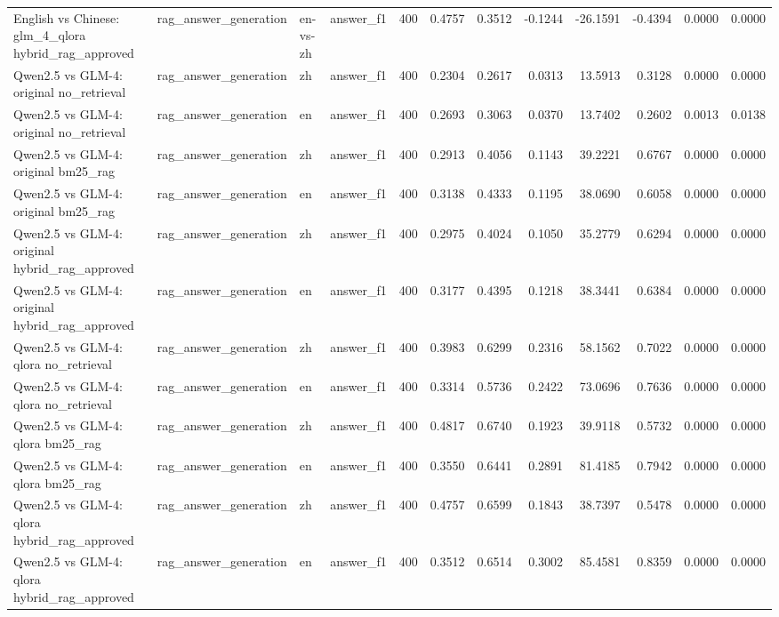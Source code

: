 \begin{tabular}{llllrrrrrrrr}
English vs Chinese: glm_4_qlora hybrid_rag_approved & rag_answer_generation & en-vs-zh & answer_f1 & 400 & 0.4757 & 0.3512 & -0.1244 & -26.1591 & -0.4394 & 0.0000 & 0.0000 \\
Qwen2.5 vs GLM-4: original no_retrieval & rag_answer_generation & zh & answer_f1 & 400 & 0.2304 & 0.2617 & 0.0313 & 13.5913 & 0.3128 & 0.0000 & 0.0000 \\
Qwen2.5 vs GLM-4: original no_retrieval & rag_answer_generation & en & answer_f1 & 400 & 0.2693 & 0.3063 & 0.0370 & 13.7402 & 0.2602 & 0.0013 & 0.0138 \\
Qwen2.5 vs GLM-4: original bm25_rag & rag_answer_generation & zh & answer_f1 & 400 & 0.2913 & 0.4056 & 0.1143 & 39.2221 & 0.6767 & 0.0000 & 0.0000 \\
Qwen2.5 vs GLM-4: original bm25_rag & rag_answer_generation & en & answer_f1 & 400 & 0.3138 & 0.4333 & 0.1195 & 38.0690 & 0.6058 & 0.0000 & 0.0000 \\
Qwen2.5 vs GLM-4: original hybrid_rag_approved & rag_answer_generation & zh & answer_f1 & 400 & 0.2975 & 0.4024 & 0.1050 & 35.2779 & 0.6294 & 0.0000 & 0.0000 \\
Qwen2.5 vs GLM-4: original hybrid_rag_approved & rag_answer_generation & en & answer_f1 & 400 & 0.3177 & 0.4395 & 0.1218 & 38.3441 & 0.6384 & 0.0000 & 0.0000 \\
Qwen2.5 vs GLM-4: qlora no_retrieval & rag_answer_generation & zh & answer_f1 & 400 & 0.3983 & 0.6299 & 0.2316 & 58.1562 & 0.7022 & 0.0000 & 0.0000 \\
Qwen2.5 vs GLM-4: qlora no_retrieval & rag_answer_generation & en & answer_f1 & 400 & 0.3314 & 0.5736 & 0.2422 & 73.0696 & 0.7636 & 0.0000 & 0.0000 \\
Qwen2.5 vs GLM-4: qlora bm25_rag & rag_answer_generation & zh & answer_f1 & 400 & 0.4817 & 0.6740 & 0.1923 & 39.9118 & 0.5732 & 0.0000 & 0.0000 \\
Qwen2.5 vs GLM-4: qlora bm25_rag & rag_answer_generation & en & answer_f1 & 400 & 0.3550 & 0.6441 & 0.2891 & 81.4185 & 0.7942 & 0.0000 & 0.0000 \\
Qwen2.5 vs GLM-4: qlora hybrid_rag_approved & rag_answer_generation & zh & answer_f1 & 400 & 0.4757 & 0.6599 & 0.1843 & 38.7397 & 0.5478 & 0.0000 & 0.0000 \\
Qwen2.5 vs GLM-4: qlora hybrid_rag_approved & rag_answer_generation & en & answer_f1 & 400 & 0.3512 & 0.6514 & 0.3002 & 85.4581 & 0.8359 & 0.0000 & 0.0000 \\
\bottomrule
\end{tabular}

